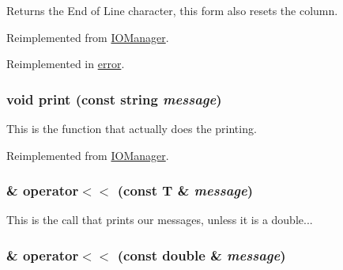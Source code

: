 Returns the End of Line character, this form also resets the column. 

Reimplemented from \hyperlink{classJKBuilder_1_1IOManager_a7f207ac705d33a0cd9794a9f0b4a1fa0}{IOManager}.

Reimplemented in \hyperlink{classJKBuilder_1_1error_a7f207ac705d33a0cd9794a9f0b4a1fa0}{error}.\hypertarget{classJKBuilder_1_1printer_aa32ee0a81ade611982bfc9861c5a05bb}{
\subsubsection[{print}]{\setlength{\rightskip}{0pt plus 5cm}void print (const string {\em message})}}
\label{classJKBuilder_1_1printer_aa32ee0a81ade611982bfc9861c5a05bb}


This is the function that actually does the printing. 

Reimplemented from \hyperlink{classJKBuilder_1_1IOManager_a3abc9519dd5220ecb1154daa25f557fe}{IOManager}.\hypertarget{classJKBuilder_1_1IOManager_a505a35212a21e4884ed24b021c0add4b}{
\subsubsection[{operator$<$$<$}]{ \& operator$<$$<$ (const T \& {\em message})}}
\label{classJKBuilder_1_1IOManager_a505a35212a21e4884ed24b021c0add4b}


This is the call that prints our messages, unless it is a double... \hypertarget{classJKBuilder_1_1IOManager_a127779d1803b6ffe9e44a3a36e46910e}{
\subsubsection[{operator$<$$<$}]{ \& operator$<$$<$ (const double \& {\em message})}}
\label{classJKBuilder_1_1IOManager_a127779d1803b6ffe9e44a3a36e46910e}


